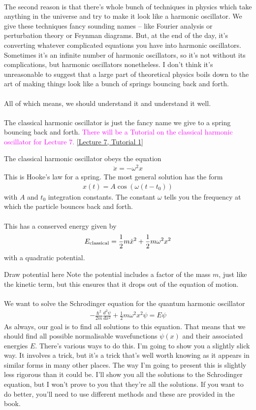 \documentclass[12pt]{article}
\def\be{\begin{eqnarray}}
\def\ee{\end{eqnarray}}
\newcommand{\nn}{\nonumber}
\newcommand\para{\paragraph{}}
\newcommand{\co}{\color{olive}}
\newcommand{\cblue}{\color{blue}}
\newcommand{\alyssa}{\textcolor{magenta}}
\begin{document}
\para
The second reason is that there's whole bunch of techniques in physics which take anything in the universe and try to make it look like a harmonic oscillator. We give these techniques fancy sounding names -- like Fourier analysis or perturbation theory or Feynman diagrams. But, at the end of the day, it's converting whatever complicated equations you have into harmonic oscillators. Sometimes it's an infinite number of harmonic oscillators, so it's not without its complications, but harmonic oscillators nonetheless. I don't think it's unreasonable to suggest that a large part of theoretical physics boils down to the art of making things look like a bunch of springs bouncing back and forth. 

\para
All of which means, we should understand it and understand it well. 



\para
The classical harmonic oscillator is just the fancy name we give to a spring bouncing back and forth. \alyssa{There will be a Tutorial on the classical harmonic oscillator for Lecture 7.} \href{https://drive.google.com/file/d/1ilchItBj6ydShAizOPrLgBx9beY4JqNd/view?usp=drive_link}{[Lecture 7, Tutorial 1]}

{\color{olive} The classical harmonic oscillator obeys the equation
%
\be \ddot{x} = -\omega^2 x\nn\ee
%
This is Hooke's law for a spring. The most general solution has the form 
%
\be x(t) = A\cos(\omega(t-t_0)) \nn\ee
%
with $A$ and $t_0$ integration constants. The constant $\omega$ tells you the frequency at which the particle bounces back and forth. 

\para
This has a conserved energy given by
%
\be E_{\rm classical} = \frac{1}{2}m\dot{x}^2 + \frac{1}{2}m\omega^2x^2\nn\ee
%
with a quadratic potential.} 

{\cblue Draw potential here} Note the potential includes a factor of the mass $m$, just like the kinetic term, but this ensures that it drops out of the equation of motion. 

\para
{\co We want to solve the Schrodinger equation for the quantum harmonic oscillator
%
\be -\frac{\hbar^2}{2m}\frac{d^2\psi}{dx^2} + \frac{1}{2}m\omega^2 x^2\psi = E\psi\nn\ee
%
}
As always, our goal is to find all solutions to this equation. That means that we should find all possible normalisable wavefunctions $\psi(x)$ and their associated energies $E$. 
There's various ways to do this. I'm going to show you a slightly slick way. It involves a trick, but it's a trick that's well worth knowing as it appears in similar forms in many other places. The way I'm going to present this is slightly less rigorous than it could be. I'll show you all the solutions to the Schrodinger equation, but I won't prove to you that they're all the solutions. If you want to do better, you'll need to use different methods and these are provided in the book. 
\end{document}
